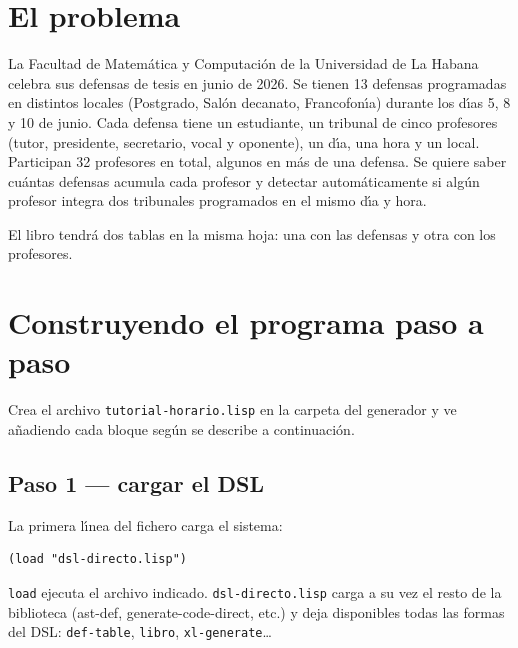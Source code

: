\documentclass[12pt,a4paper]{report}
\begin{document}
\section{El problema}
\label{sec:problema}

La Facultad de Matem\'atica y Computaci\'on de la Universidad de La Habana
celebra sus defensas de tesis en junio de 2026.
Se tienen 13 defensas programadas en distintos locales (Postgrado, Sal\'on
decanato, Francofon\'{\i}a) durante los d\'{\i}as 5, 8 y 10 de junio.
Cada defensa tiene un estudiante, un tribunal de cinco profesores
(tutor, presidente, secretario, vocal y oponente), un d\'{\i}a, una hora y un local.
Participan 32 profesores en total, algunos en m\'as de una defensa.
Se quiere saber cu\'antas defensas acumula cada profesor
y detectar autom\'aticamente si alg\'un profesor integra dos tribunales
programados en el mismo d\'{\i}a y hora.

El libro tendr\'a dos tablas en la misma hoja:
una con las defensas y otra con los profesores.

\section{Construyendo el programa paso a paso}
\label{sec:pasos}

Crea el archivo \texttt{tutorial-horario.lisp} en la carpeta del generador
y ve a\~nadiendo cada bloque seg\'un se describe a continuaci\'on.

\subsection{Paso 1 --- cargar el DSL}

La primera l\'{\i}nea del fichero carga el sistema:

\begin{lstlisting}[caption={tutorial-horario.lisp --- inicio.}]
(load "dsl-directo.lisp")
\end{lstlisting}

\texttt{load} ejecuta el archivo indicado.
\texttt{dsl-directo.lisp} carga a su vez el resto de la biblioteca
(ast-def, generate-code-direct, etc.) y deja disponibles todas las formas
del DSL: \texttt{def-table}, \texttt{libro}, \texttt{xl-generate}\ldots
\end{document}

